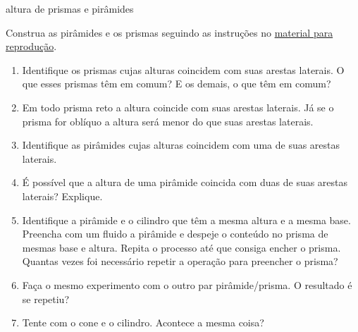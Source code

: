 \begin{task}{altura de prismas e pirâmides}



Construa as pirâmides e os prismas seguindo as instruções no \href{https://docs.google.com/document/d/12ERHynaBYMapyryZgVE3RKWWpxqF3BUgNvVhK5ywLmc/edit}{material para reprodução}.
\begin{enumerate}
\item {} 
Identifique os prismas cujas alturas coincidem com suas arestas laterais. O que esses prismas têm em comum? E os demais, o que têm em comum?

\item {} 
Em todo prisma reto a altura coincide com suas arestas laterais. Já se o prisma for oblíquo a altura será menor do que suas arestas laterais.

\item {} 
Identifique as pirâmides cujas alturas coincidem com uma de suas arestas laterais.

\item {} 
É possível que a altura de uma pirâmide coincida com duas de suas arestas laterais? Explique.

\item {} 
Identifique a pirâmide e o cilindro que têm a mesma altura e a mesma base. Preencha com um fluido a pirâmide e despeje o conteúdo no prisma de mesmas base e altura. Repita o processo até que consiga encher o prisma. Quantas vezes foi necessário repetir a operação para preencher o prisma?

\item {} 
Faça o mesmo experimento com o outro par pirâmide/prisma. O resultado é se repetiu?

\item {} 
Tente com o cone e o cilindro. Acontece a mesma coisa?

\end{enumerate}
\end{task}

